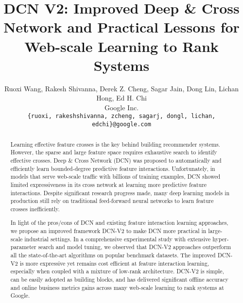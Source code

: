 \documentclass[sigconf]{acmart}
\begin{document}
\title{DCN V2: Improved Deep \& Cross Network and Practical Lessons for Web-scale Learning to Rank Systems}

\author{Ruoxi Wang, Rakesh Shivanna, Derek Z. Cheng, Sagar Jain, Dong Lin, Lichan Hong, Ed H. Chi \\ Google Inc. \\
\texttt{\{ruoxi, rakeshshivanna, zcheng, sagarj, dongl, lichan, edchi\}@google.com}
}





\begin{abstract}

Learning effective feature crosses is the key behind building recommender systems. However, the sparse and large feature space requires exhaustive search to identify effective crosses. Deep \& Cross Network (DCN) was proposed to automatically and efficiently learn bounded-degree predictive feature interactions. Unfortunately, in models that serve web-scale traffic with billions of training examples, DCN showed limited expressiveness in its cross network at learning more predictive feature interactions. Despite significant research progress made, many deep learning models in production still rely on traditional feed-forward neural networks to learn feature crosses inefficiently.

In light of the pros/cons of DCN and existing feature interaction learning approaches, we 
propose an improved framework {DCN-V2} to make DCN more practical in large-scale industrial settings. In a comprehensive experimental study with extensive hyper-parameter search and model tuning, we observed that {DCN-V2} approaches outperform all the state-of-the-art algorithms on popular benchmark datasets. The improved {DCN-V2} is more expressive yet remains cost efficient at feature interaction learning, especially when coupled with a mixture of low-rank architecture. {DCN-V2} is simple, can be easily adopted as building blocks, and has delivered significant offline accuracy and online business metrics gains across many web-scale learning to rank systems at Google.

\end{abstract}





\pagestyle{plain} 



\maketitle
\end{document}
